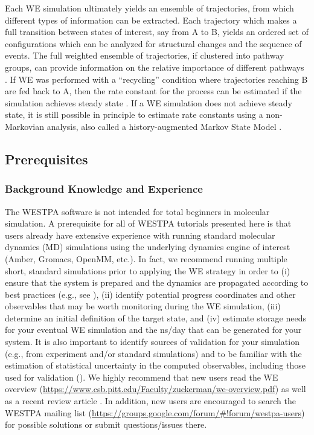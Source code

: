 \documentclass[9pt,tutorial]{livecoms}
\begin{document}
Each WE simulation ultimately yields an ensemble of trajectories, from which different types of information can be extracted. 
Each trajectory which makes a full transition between states of interest, say from A to B, yields an ordered set of configurations which can be analyzed for structural changes and the sequence of events. 
The full weighted ensemble of trajectories, if clustered into pathway groups, can provide information on the relative importance of different pathways \citep{Ernesto2019}. 
If WE was performed with a “recycling” condition where trajectories reaching B are fed back to A, then the rate constant for the process can be estimated if the simulation achieves steady state \citep{Divesh2010,ZuckermanChong2017}. 
If a WE simulation does not achieve steady state, it is still possible in principle to estimate rate constants using a non-Markovian analysis, also called a history-augmented Markov State Model \cite{Ernesto2014,Upendra2019,Jeremy2019}.

\subsection{Prerequisites}

\subsubsection{Background Knowledge and Experience}

The WESTPA software is not intended for total beginners in molecular simulation. 
A prerequisite for all of WESTPA tutorials presented here is that users already have extensive experience with running standard molecular dynamics (MD) simulations using the underlying dynamics engine of interest (Amber, Gromacs, OpenMM, etc.). 
In fact, we recommend running multiple short, standard simulations prior to applying the WE strategy in order to (i) ensure that the system is prepared and the dynamics are propagated according to best practices (e.g., see \citep{Mobley2019}), (ii) identify potential progress coordinates and other observables that may be worth monitoring during the WE simulation, (iii) determine an initial definition of the target state, and (iv) estimate storage needs for your eventual WE simulation and the ns/day that can be generated for your system. 
It is also important to identify sources of validation for your simulation (e.g., from experiment and/or standard simulations) and to be familiar with the estimation of statistical uncertainty in the computed observables, including those used for validation (\citep{Grossfield2019}). 
We highly recommend that new users read the WE overview (\url{https://www.csb.pitt.edu/Faculty/zuckerman/we-overview.pdf}) as well as a recent review article \citep{ZuckermanChong2017}. 
In addition, new users are encouraged to search the WESTPA mailing list (\url{https://groups.google.com/forum/#!forum/westpa-users}) for possible solutions or submit questions/issues there.
\end{document}
